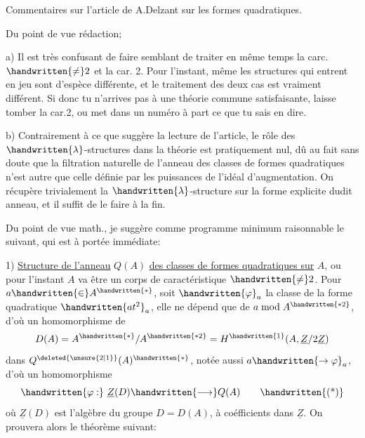 \begin{flushright}\end{flushright}

\begin{center}Commentaires sur l'article de A.Delzant sur les formes quadratiques.\end{center}

Du point de vue rédaction;

a) Il est très confusant de faire semblant de traiter en même temps la carc. $\handwritten{\ne}2$ et la car. 2. Pour l'instant, même les structures qui entrent en jeu sont d'espèce différente, et le traitement des deux cas est vraiment différent. Si donc tu n'arrives pas à une théorie commune satisfaisante, laisse tomber la car.2, ou met dans un numéro à part ce que tu sais en dire.

b) Contrairement à ce que suggère la lecture de l'article, le rôle des $\handwritten{\lambda}$-structures dans la théorie est pratiquement nul, dû au fait sans doute que la filtration naturelle de l'anneau des classes de formes quadratiques n'est autre que celle définie par les puissances de l'idéal d'augmentation. On récupère trivialement la $\handwritten{\lambda}$-structure sur la forme explicite dudit anneau, et il suffit de le faire à la fin.

 Du point de vue math., je suggère comme programme minimum raisonnable le suivant, qui est à portée immédiate:

1) \uline{Structure de l'anneau} $Q(A)$ \uline{des classes de formes quadratiques sur} $A$, ou pour l'instant $A$ va être un corps de caractéristique $\handwritten{\ne}2$. Pour $a\handwritten{\in}A^{\handwritten{*}}$, soit $\handwritten{\varphi}_a$ la classe de la forme quadratique $\handwritten{at^2}_{a}$, elle ne dépend que de $a\bmod A^{\handwritten{*2}}$, d'où un homomorphisme de
\[
D(A)=A^{\handwritten{*}}/A^{\handwritten{*2}}=H^{\handwritten{1}}(A,\underline{Z}/2\underline{Z})
\]
dans $Q^{\deleted{\unsure{2|1}}}(A)^{\handwritten{*}}$, notée aussi $a\handwritten{\to\varphi}_a$, d'où un homomorphisme
\[
\handwritten{\varphi:}\ \underline{Z}(D)\handwritten{\longrightarrow}Q(A)
\tag*{\handwritten{(*)}}
\]
où $\underline{Z}(D)$ est l'algèbre du groupe $D=D(A)$, à coéfficients dans $\underline{Z}$. On prouvera alors le théorème suivant:

